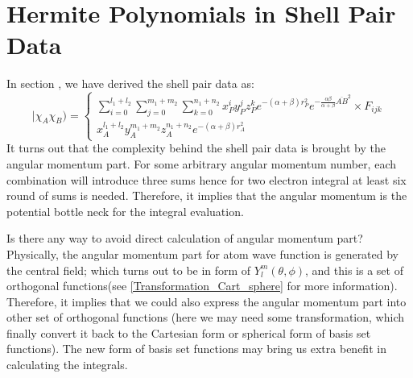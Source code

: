 \section{Hermite Polynomials in Shell Pair Data}
%
%
%
%
In section \label{Gaussian_Primitive_Product_Theorem}, we have derived the shell pair data as:
\begin{equation}
\label{basic_shell_pair_data_form}
 |\chi_{A}\chi_{B}) = 
\begin{cases}
 \sum_{i=0}^{l_{1}+l_{2}}\sum_{j=0}^{m_{1}+m_{2}}\sum_{k=0}^{n_{1}+n_{2}}
   x_{P}^{i}y_{P}^{j}z_{P}^{k}
   e^{-(\alpha+\beta)r_{P}^{2}} e^{-\frac{\alpha\beta}{\alpha+\beta}\overline{AB}^{2}}
   \times F_{ijk}  \\
 x_{A}^{l_{1}+l_{2}}y_{A}^{m_{1}+m_{2}}z_{A}^{n_{1}+n_{2}}e^{-(\alpha+\beta)r_{A}^{2}}
\end{cases}
\end{equation}
It turns out that the complexity behind the shell pair data is brought by the angular momentum part.
For some arbitrary angular momentum number, each combination will introduce three sums hence
for two electron integral at least six round of sums is needed. Therefore, it implies that the 
angular momentum is the potential bottle neck for the integral evaluation.

Is there any way to avoid direct calculation of angular momentum part? Physically, the angular 
momentum part for atom wave function is generated by the central field; which turns out to be 
in form of $Y^{m}_{l}(\theta,\phi)$, and this is a set of orthogonal functions(see 
\ref{Transformation_Cart_sphere} for more information). Therefore, it implies that we could also
express the angular momentum part into other set of orthogonal functions (here we may need some
transformation, which finally convert it back to the Cartesian form or spherical form of 
basis set functions). The new form of basis set functions may bring us extra benefit in calculating
the integrals.
 
